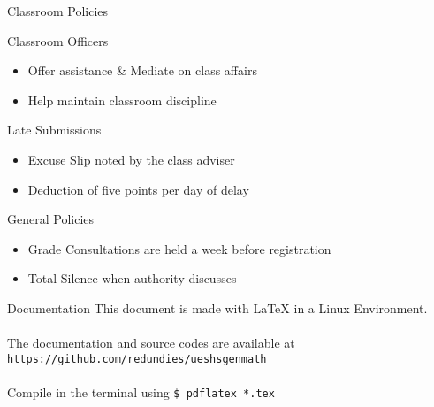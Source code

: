 \documentclass[14pt, aspectratio=169]{beamer}
\begin{document}
\begin{frame}{Classroom Policies}
 \begin{block}{Classroom Officers}
  \begin{itemize}
   \item Offer assistance \& Mediate on class affairs
   \item Help maintain classroom discipline
  \end{itemize}
 \end{block}

 \begin{block}{Late Submissions}
  \begin{itemize}
   \item Excuse Slip noted by the class adviser
   \item Deduction of five points per day of delay
  \end{itemize}
 \end{block}

 \begin{alertblock}{General Policies}
  \begin{itemize}
   \item Grade Consultations are held a week before registration
   \item Total Silence when authority discusses
  \end{itemize}
 \end{alertblock}
\end{frame}

\begin{frame}{Documentation}
 This document is made with {\textrm \LaTeX} in a Linux Environment. \\~\\
 The documentation and source codes are available at \\
 \texttt{https://github.com/redundies/ueshsgenmath} \\~\\
 Compile in the terminal using
 \texttt{\$ pdflatex *.tex}
\end{frame}
\end{document}

